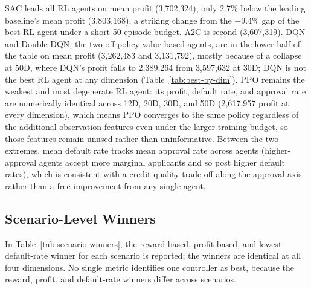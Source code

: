 \documentclass[preprint,review,authoryear,12pt]{elsarticle}
\begin{document}
SAC leads all RL agents on mean profit (3{,}702{,}324), only 2.7\% below the leading
baseline's mean profit (3{,}803{,}168), a striking change from the $-$9.4\% gap of the
best RL agent under a short 50-episode budget. A2C is second (3{,}607{,}319). DQN and
Double-DQN, the two off-policy value-based agents, are in the lower half of the table on
mean profit (3{,}262{,}483 and 3{,}131{,}792), mostly because of a collapse at 50D, where
DQN's profit falls to 2{,}389{,}264 from 3{,}597{,}632 at 30D; DQN is not the best RL
agent at any dimension (Table~\ref{tab:best-by-dim}). PPO remains the weakest and
most degenerate RL agent: its profit, default rate, and approval rate are numerically
identical across 12D, 20D, 30D, and 50D (2{,}617{,}957 profit at every dimension), which
means PPO converges to the same policy regardless of the additional observation features
even under the larger training budget, so those features remain unused rather than
uninformative. Between the two extremes, mean default rate tracks mean approval rate
across agents (higher-approval agents accept more marginal applicants and so post higher
default rates), which is consistent with a credit-quality trade-off along the approval
axis rather than a free improvement from any single agent.

\subsection{Scenario-Level Winners}
\label{sec:scenario-winners}

In Table~\ref{tab:scenario-winners}, the reward-based, profit-based, and
lowest-default-rate winner for each scenario is reported; the winners are identical at
all four dimensions. No single metric identifies one controller as best, because the
reward, profit, and default-rate winners differ across scenarios.
\end{document}
